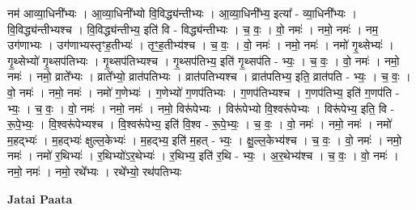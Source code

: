 \documentclass[17pt]{extarticle}
\begin{document}
नम॑ आव्या॒धिनी᳚भ्यः । आ॒व्या॒धिनी᳚भ्यो वि॒विद्ध्य॑न्तीभ्यः । आ॒व्या॒धिनी᳚भ्य॒ इत्या᳚ - व्या॒धिनी᳚भ्यः । वि॒विद्ध्य॑न्तीभ्यश्च । वि॒विद्ध्य॑न्तीभ्य॒ इति॑ वि - विद्ध्य॑न्तीभ्यः । च॒ वः॒ । वो॒ नमः॑ । नमो॒ नमः॑ । नम॒ उग॑णाभ्यः । उग॑णाभ्यस्तृꣳह॒तीभ्यः॑ । तृꣳ॒॒ह॒तीभ्य॑श्च । च॒ वः॒ । वो॒ नमः॑ । नमो॒ नमः॑ । नमो॑ गृ॒थ्सेभ्यः॑ । गृ॒थ्सेभ्यो॑ गृ॒थ्सप॑तिभ्यः । गृ॒थ्सप॑तिभ्यश्च । गृ॒थ्सप॑तिभ्य॒ इति॑ गृ॒थ्सप॑ति - भ्यः॒ । च॒ वः॒ । वो॒ नमः॑ । नमो॒ नमः॑ । नमो॒ व्राते᳚भ्यः । व्राते᳚भ्यो॒ व्रात॑पतिभ्यः । व्रात॑पतिभ्यश्च । व्रात॑पतिभ्य॒ इति॒ व्रात॑पति - भ्यः॒ । च॒ वः॒ । वो॒ नमः॑ । नमो॒ नमः॑ । नमो॑ ग॒णेभ्यः॑ । ग॒णेभ्यो॑ ग॒णप॑तिभ्यः । ग॒णप॑तिभ्यश्च । ग॒णप॑तिभ्य॒ इति॑ ग॒णप॑ति - भ्यः॒ । च॒ वः॒ । वो॒ नमः॑ । नमो॒ नमः॑ । नमो॒ विरू॑पेभ्यः । विरू॑पेभ्यो वि॒श्वरू॑पेभ्यः । विरू॑पेभ्य॒ इति॒ वि - रू॒पे॒भ्यः॒ । वि॒श्वरू॑पेभ्यश्च । वि॒श्वरू॑पेभ्य॒ इति॑ वि॒श्व - रू॒पे॒भ्यः॒ । च॒ वः॒ । वो॒ नमः॑ । नमो॒ नमः॑ । नमो॑ म॒हद्भ्यः॑ । म॒हद्भ्यः॑ क्षुल्ल॒केभ्यः॑ । म॒हद्भ्य॒ इति॑ म॒हत् - भ्यः॒ । क्षु॒ल्ल॒केभ्य॑श्च । च॒ वः॒ । वो॒ नमः॑ । नमो॒ नमः॑ । नमो॑ र॒थिभ्यः॑ । र॒थिभ्यो॑ऽर॒थेभ्यः॑ । र॒थिभ्य॒ इति॑ र॒थि - भ्यः॒ । अ॒र॒थेभ्य॑श्च । च॒ वः॒ । वो॒ नमः॑ । नमो॒ नमः॑ । नमो॒ रथे᳚भ्यः । रथे᳚भ्यो॒ रथ॑पतिभ्यः \newline

\textbf{Jatai Paata} \newline
\end{document}
